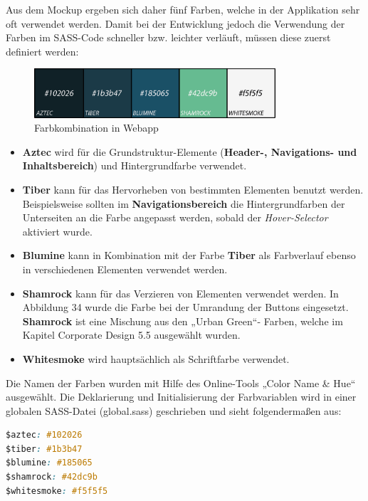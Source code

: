\clearpage
Aus dem Mockup ergeben sich daher fünf Farben, welche in der Applikation sehr oft verwendet werden. Damit bei der Entwicklung jedoch die Verwendung der Farben im SASS-Code schneller bzw. leichter verläuft, müssen diese zuerst definiert werden:

\begin{figure}[ht]
    \centering
	\includegraphics[width=0.8\textwidth]{images/color-combination}
	\caption{Farbkombination in Webapp}
\end{figure}

\begin{itemize}
    \item \textbf{Aztec} wird für die Grundstruktur-Elemente (\textbf{Header-, Navigations- und Inhaltsbereich}) und Hintergrundfarbe verwendet.
    \item \textbf{Tiber} kann für das Hervorheben von bestimmten Elementen benutzt werden. Beispielsweise sollten im \textbf{Navigationsbereich} die Hintergrundfarben der Unterseiten an die Farbe angepasst werden, sobald der \textit{Hover-Selector} aktiviert wurde. 
    \item \textbf{Blumine} kann in Kombination mit der Farbe \textbf{Tiber} als Farbverlauf ebenso in verschiedenen Elementen verwendet werden.
    \item \textbf{Shamrock} kann für das Verzieren von Elementen verwendet werden. In Abbildung 34 wurde die Farbe bei der Umrandung der Buttons eingesetzt. \textbf{Shamrock} ist eine Mischung aus den „Urban Green“- Farben, welche im Kapitel Corporate Design 5.5 ausgewählt wurden.
    \item \textbf{Whitesmoke} wird hauptsächlich als Schriftfarbe verwendet.
\end{itemize}

Die Namen der Farben wurden mit Hilfe des Online-Tools „Color Name \& Hue“ ausgewählt. \cite{color} Die Deklarierung und Initialisierung der Farbvariablen wird in einer globalen SASS-Datei (global.sass) geschrieben und sieht folgendermaßen aus:

\lstset{escapechar=?,style=customjava}
\begin{lstlisting}[language=css, caption=Initialisierung der SASS-Variablen]
$aztec: #102026
$tiber: #1b3b47
$blumine: #185065
$shamrock: #42dc9b
$whitesmoke: #f5f5f5
\end{lstlisting}
\lstset{escapechar=@,style=customjava}

